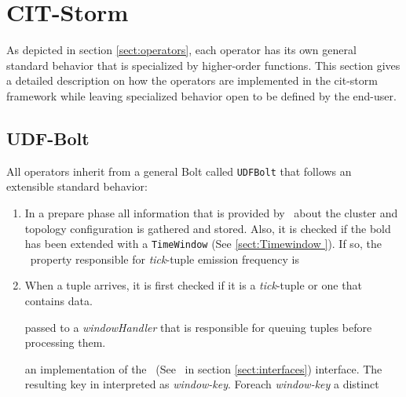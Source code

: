 \section{CIT-Storm}
\label{sect:citStorm}

As depicted in section \ref{sect:operators}, each operator has its own general standard behavior that is specialized by higher-order functions. This section gives a detailed description on how the operators are implemented in the cit-storm framework while leaving specialized behavior open to be defined by the end-user. 

\subsection{UDF-Bolt}
\label{sect:udfBolt}

All operators inherit from a general Bolt called \texttt{UDFBolt} that follows an extensible standard behavior:

\begin{enumerate}
	\item In a prepare phase all information that is provided by \storm\ about the cluster and topology configuration is gathered and stored. Also, it is checked if the bold has been extended with a \texttt{TimeWindow} (See \ref{sect:Timewindow }). If so, the \storm\ property responsible for \textsl{tick}-tuple emission frequency is 
	
	\item
		When a tuple arrives, it is first checked if it is a \textsl{tick}-tuple or one that contains data. 
		
		 passed to a \textsl{windowHandler} that is responsible for queuing tuples before processing them.
		
		an implementation of the \ikeyconfig\ (See \ikeyconfig\ in section \ref{sect:interfaces}) interface. The resulting key in interpreted as \textsl{window-key}. Foreach \textsl{window-key} a distinct 
\end{enumerate}

